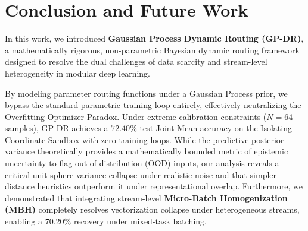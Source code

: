 \section{Conclusion and Future Work}
\label{sec:conclusion}

In this work, we introduced \textbf{Gaussian Process Dynamic Routing (GP-DR)}, a mathematically rigorous, non-parametric Bayesian dynamic routing framework designed to resolve the dual challenges of data scarcity and stream-level heterogeneity in modular deep learning. 

By modeling parameter routing functions under a Gaussian Process prior, we bypass the standard parametric training loop entirely, effectively neutralizing the Overfitting-Optimizer Paradox. Under extreme calibration constraints ($N=64$ samples), GP-DR achieves a $72.40\%$ test Joint Mean accuracy on the Isolating Coordinate Sandbox with zero training loops. While the predictive posterior variance theoretically provides a mathematically bounded metric of epistemic uncertainty to flag out-of-distribution (OOD) inputs, our analysis reveals a critical unit-sphere variance collapse under realistic noise and that simpler distance heuristics outperform it under representational overlap. Furthermore, we demonstrated that integrating stream-level \textbf{Micro-Batch Homogenization (MBH)} completely resolves vectorization collapse under heterogeneous streams, enabling a $70.20\%$ recovery under mixed-task batching.

